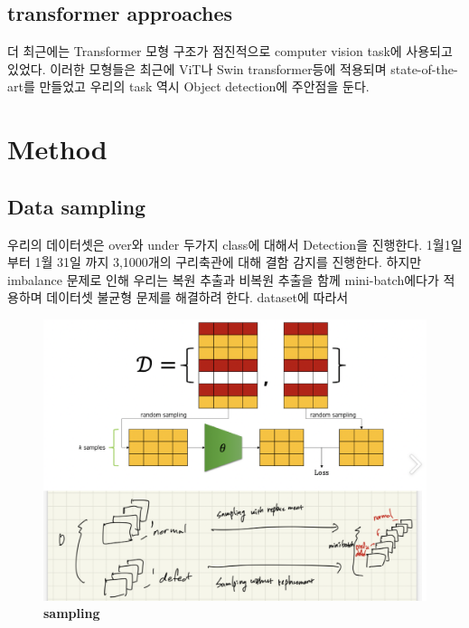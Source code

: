 \documentclass[10pt,twocolumn,letterpaper]{article}
\begin{document}
\subsection{transformer approaches}
더 최근에는 Transformer 모형 구조가 점진적으로 computer vision task에 사용되고 있었다.
이러한 모형들은 최근에 ViT나 Swin transformer등에 적용되며 state-of-the-art를 만들었고 
우리의 task 역시 Object detection에 주안점을 둔다.

\section{Method}

\subsection{Data sampling}

우리의 데이터셋은 over와 under 두가지 class에 대해서 Detection을 진행한다.
1월1일 부터 1월 31일 까지 3,1000개의 구리축관에 대해 결함 감지를 진행한다.
하지만 imbalance 문제로 인해 우리는 복원 추출과 비복원 추출을 함께 mini-batch에다가 적용하며 
데이터셋 불균형 문제를 해결하려 한다. dataset에 따라서
\begin{figure}[h]
  \includegraphics[width=\linewidth]{figure/data_sampling}
     \caption{\small \textbf{sampling} }
  \label{sampling}
  \end{figure}
\end{document}
